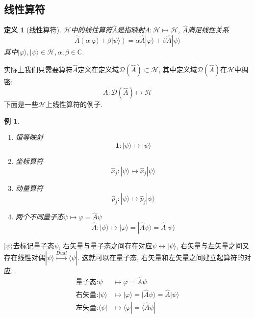 \documentclass[a4paper,11pt]{book}
\newtheorem{definition}{\hspace{2em}定义}[section]
\newtheorem{example}{例}[section]
\begin{document}
\subsection{线性算符}
\begin{definition}[线性算符]
  $\mathcal{H}$中的线性算符$\hat{A}$是指映射$A:\mathcal{H}\longmapsto\mathcal{H}$, $\hat{A}$满足线性关系
\begin{equation*}
  \hat{A}(\alpha|\varphi\rangle+\beta|\psi\rangle)=\alpha \hat{A}|\varphi\rangle+\beta \hat{A}|\psi\rangle
\end{equation*}
其中$|\varphi\rangle, |\psi\rangle\in\mathcal{H},\alpha,\beta\in\mathbb{C}$.
\end{definition}
实际上我们只需要算符$\hat{A}$定义在定义域$\mathcal{D}(\hat{A})\subset\mathcal{H}$, 其中定义域$\mathcal{D}(\hat{A})$在$\mathcal{H}$中稠密:
\begin{equation*}
  A:\mathcal{D}(\hat{A})\longmapsto\mathcal{H}
\end{equation*}
下面是一些$\mathcal{H}$上线性算符的例子.
\begin{example}\quad
  \begin{enumerate}[1]
    \item 恒等映射
\begin{equation*}
  \mathbf{1}:|\psi\rangle\longmapsto|\psi\rangle
\end{equation*}
    \item 坐标算符
\begin{equation*}
  \hat{x}_j:|\psi\rangle\longmapsto \hat{x}_j|\psi\rangle
\end{equation*}
    \item 动量算符
\begin{equation*}
  \hat{p}_j:|\psi\rangle\longmapsto \hat{p}_j|\psi\rangle
\end{equation*}
    \item 两个不同量子态$\psi\longmapsto\varphi=\hat{A}\psi$
\begin{equation*}
  \hat{A}:|\psi\rangle\longmapsto|\varphi\rangle=|\hat{A}\psi\rangle=\hat{A}|\psi\rangle
\end{equation*}
  \end{enumerate}
\end{example}
$|\psi\rangle$去标记量子态$\psi$, 右矢量与量子态之间存在对应$\psi\longleftrightarrow|\psi\rangle$, 右矢量与左矢量之间又存在线性对偶$|\psi\rangle\stackrel{Dual}{\longmapsto}\langle\psi|$. 这就可以在量子态, 右矢量和左矢量之间建立起算符的对应.
\begin{equation*}
  \begin{split}
     \text{量子态:}\psi & \longmapsto\varphi=\hat{A}\psi \\
     \text{右矢量:}|\psi\rangle & \longmapsto|\varphi\rangle=|\hat{A}\psi\rangle=\hat{A}|\psi\rangle \\
     \text{左矢量:}\langle\psi| & \longmapsto\langle\varphi|=\langle\hat{A}\psi|
  \end{split}
\end{equation*}
\end{document}
